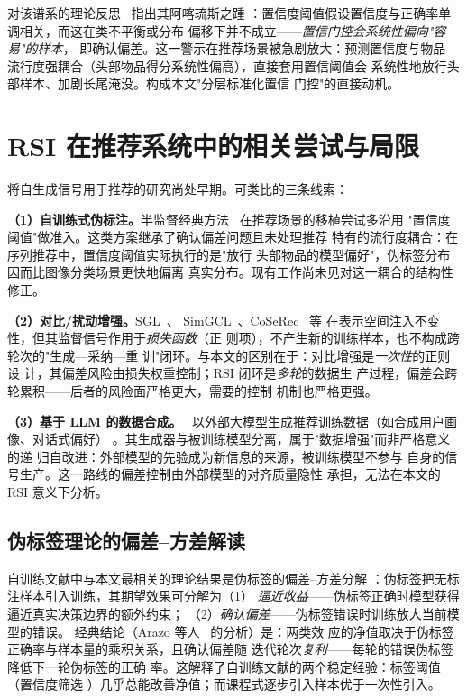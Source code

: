 对该谱系的理论反思~\cite{arazo2020pseudo} 指出其阿喀琉斯之踵
：置信度阈值假设置信度与正确率单调相关，而这在类不平衡或分布
偏移下并不成立——\emph{置信门控会系统性偏向"容易"的样本}，
即确认偏差。这一警示在推荐场景被急剧放大：预测置信度与物品
流行度强耦合（头部物品得分系统性偏高），直接套用置信阈值会
系统性地放行头部样本、加剧长尾淹没。构成本文"分层标准化置信
门控"的直接动机。

\section{RSI 在推荐系统中的相关尝试与局限}
将自生成信号用于推荐的研究尚处早期。可类比的三条线索：

\textbf{（1）自训练式伪标注。}半监督经典方法~\cite%
{yarowsky1995wsd,lee2013pseudo} 在推荐场景的移植尝试多沿用
"置信度阈值"做准入。这类方案继承了确认偏差问题且未处理推荐
特有的流行度耦合：在序列推荐中，置信度阈值实际执行的是"放行
头部物品的模型偏好"，伪标签分布因而比图像分类场景更快地偏离
真实分布。现有工作尚未见对这一耦合的结构性修正。

\textbf{（2）对比/扰动增强。}SGL~\cite{xie2022sgl}、
SimGCL~\cite{yu2022simgcl}、CoSeRec~\cite{liu2021coserec} 等
在表示空间注入不变性，但其监督信号作用于\emph{损失函数}（正
则项），不产生新的训练样本，也不构成跨轮次的"生成—采纳—重
训"闭环。与本文的区别在于：对比增强是\emph{一次性}的正则设
计，其偏差风险由损失权重控制；RSI 闭环是\emph{多轮}的数据生
产过程，偏差会跨轮累积——后者的风险面严格更大，需要的控制
机制也严格更强。

\textbf{（3）基于 LLM 的数据合成。}~\cite{wu2024llmrecsurvey}
以外部大模型生成推荐训练数据（如合成用户画像、对话式偏好）
。其生成器与被训练模型分离，属于"数据增强"而非严格意义的递
归自改进：外部模型的先验成为新信息的来源，被训练模型不参与
自身的信号生产。这一路线的偏差控制由外部模型的对齐质量隐性
承担，无法在本文的 RSI 意义下分析。

\subsection{伪标签理论的偏差--方差解读}
自训练文献中与本文最相关的理论结果是伪标签的偏差--方差分解
：伪标签把无标注样本引入训练，其期望效果可分解为（1）\emph{
逼近收益}——伪标签正确时模型获得逼近真实决策边界的额外约束；
（2）\emph{确认偏差}——伪标签错误时训练放大当前模型的错误。
经典结论（Arazo 等人~\cite{arazo2020pseudo} 的分析）是：两类效
应的净值取决于伪标签正确率与样本量的乘积关系，且确认偏差随
迭代轮次\emph{复利}——每轮的错误伪标签降低下一轮伪标签的正确
率。这解释了自训练文献的两个稳定经验：标签阈值（置信度筛选
）几乎总能改善净值；而课程式逐步引入样本优于一次性引入。

